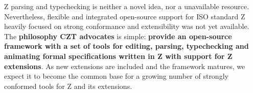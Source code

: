 \documentclass{llncs}
\begin{document}
  Z parsing and typechecking is neither a novel idea, nor a
  unavailable resource.  Nevertheless, flexible and integrated
  open-source support for ISO standard Z heavily focused on strong
  conformance and extensibility was not yet available.  The
  \textbf{philosophy CZT advocates} is simple: \textbf{provide an
  open-source framework with a set of tools for editing, parsing,
  typechecking and animating formal specifications written in Z with
  support for Z extensions}.  As new extensions are included and the
  framework matures, we expect it to become the common base for a
  growing number of strongly conformed tools for Z and its extensions.



\end{document}
